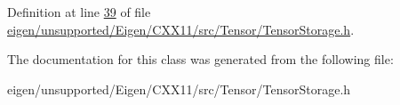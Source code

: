 Definition at line \hyperlink{eigen_2unsupported_2_eigen_2_c_x_x11_2src_2_tensor_2_tensor_storage_8h_source_l00039}{39} of file \hyperlink{eigen_2unsupported_2_eigen_2_c_x_x11_2src_2_tensor_2_tensor_storage_8h_source}{eigen/unsupported/\+Eigen/\+C\+X\+X11/src/\+Tensor/\+Tensor\+Storage.\+h}.



The documentation for this class was generated from the following file\+:\begin{DoxyCompactItemize}
\item 
eigen/unsupported/\+Eigen/\+C\+X\+X11/src/\+Tensor/\+Tensor\+Storage.\+h\end{DoxyCompactItemize}
